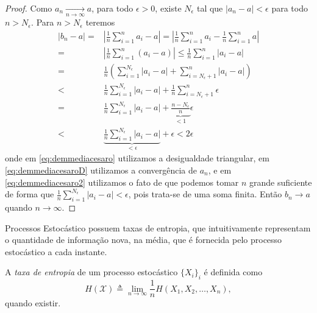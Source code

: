 \begin{proof}
  Como $a_n \xrightarrow[ n \rightarrow \infty ]{ } a$, para todo $\epsilon > 0$, existe $N_{\epsilon}$ tal que $\vert a_n - a \vert < \epsilon$
  para todo $n > N_{\epsilon}$.
  Para $n > N_{\epsilon}$ teremos
  \begin{subequations}
  \begin{align}
    \vert b_n - a \vert ={}& \left\vert \frac{1}{n} \sum_{i=1}^n a_i - a \right\vert = \left\vert \frac{1}{n} \sum_{i=1}^n a_i - \frac{1}{n} \sum_{i=1}^n a \right\vert \\
                        ={}& \left\vert \frac{1}{n} \sum_{i=1}^n (a_i - a) \right\vert  \leq  \frac{1}{n} \sum_{i=1}^n \vert a_i - a \vert \label{eq:demmediacesaro}\\
                        ={}& \frac{1}{n} \left( \sum_{i=1}^{N_{\epsilon}} \vert a_i - a \vert + \sum_{i=N_{\epsilon}+1}^n \vert a_i - a \vert \right) \\
                        <{}& \frac{1}{n} \sum_{i=1}^{N_{\epsilon}} \vert a_i - a \vert + \frac{1}{n}  \sum_{i=N_{\epsilon}+1}^n \epsilon \label{eq:demmediacesaroD}\\
                ={}& \frac{1}{n} \sum_{i=1}^{N_{\epsilon}} \vert a_i - a \vert + \underbrace{\frac{n - N_{\epsilon}}{n}}_{<1} \epsilon \\
                <{}& \underbrace{ \frac{1}{n} \sum_{i=1}^{N_{\epsilon}} \vert a_i - a \vert }_{< \epsilon } + \epsilon < 2\epsilon \label{eq:demmediacesaro2}
  \end{align}
  \end{subequations}
  onde em \ref{eq:demmediacesaro} utilizamos a desigualdade triangular,
  em \ref{eq:demmediacesaroD} utilizamos a convergência de $a_n$, e em \ref{eq:demmediacesaro2}
  utilizamos o fato de que podemos tomar $n$ grande suficiente de forma que 
  $\frac{1}{n} \sum_{i=1}^{N_{\epsilon}} \vert a_i - a \vert < \epsilon$,
  pois trata-se de uma soma finita.
  Então $b_n \rightarrow a$ quando $n \rightarrow \infty$.
\end{proof}


Processos Estocástico possuem taxas de entropia, que intuitivamente representam o
quantidade de informação nova, na média, que é fornecida pelo processo estocástico a
cada instante.

\begin{definition}
  A \emph{taxa de entropia} de um processo estocástico $\{ X_i \}_i$ é definida como
  \begin{equation}\label{eq:txentropia}
    H(\mathcal{X}) \triangleq \lim_{n \rightarrow \infty} \frac{1}{n} H(X_1, X_2, \ldots, X_n) , 
    \end{equation}
quando existir.
\end{definition}

